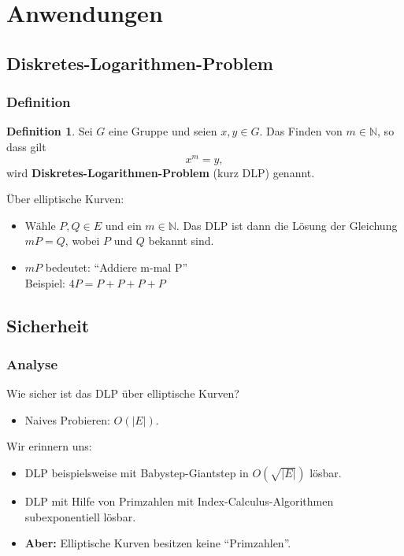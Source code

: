 \documentclass{beamer}
\theoremstyle{plain}
\theoremstyle{definition}
\newtheorem{defn}[thm]{Definition}
\theoremstyle{rem}
\begin{document}
\section{Anwendungen}
\subsection{Diskretes-Logarithmen-Problem}

\begin{frame}
    \frametitle{Definition}
    \begin{defn} \label{DLP}
        Sei $G$ eine Gruppe und seien $x,y \in G$. Das Finden von $m \in \mathbb{N}$, so dass gilt
        \begin{equation*}
            x^m = y,
        \end{equation*}
        wird \textbf{Diskretes-Logarithmen-Problem} (kurz DLP) genannt.
    \end{defn}
    \pause
    Über elliptische Kurven:
    \begin{itemize}[<+->]
        \item Wähle $P,Q \in E$ und ein $m \in \mathbb{N}$. Das DLP ist dann die Lösung der Gleichung $mP = Q$, wobei $P$ und $Q$ bekannt sind.
        \item $mP$ bedeutet: ``Addiere m-mal P''\\
	Beispiel: $4P=P+P+P+P$
    \end{itemize}

\end{frame}

\subsection{Sicherheit}

\begin{frame}
    \frametitle{Analyse}
    Wie sicher ist das DLP über elliptische Kurven?
    \pause
    \begin{itemize}
        \item Naives Probieren: $O(|E|)$.
    \end{itemize}
    \pause
    Wir erinnern uns:
    \begin{itemize}[<+->]
        \item DLP beispielsweise mit Babystep-Giantstep in $O(\sqrt{|E|})$ lösbar.
        \item DLP mit Hilfe von Primzahlen mit Index-Calculus-Algorithmen subexponentiell lösbar.
        \item[] \textbf{Aber:} Elliptische Kurven besitzen keine ``Primzahlen''.
    \end{itemize}
\end{frame}
\end{document}
